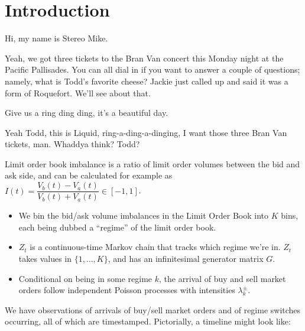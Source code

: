 \chapter{Introduction}
Hi, my name is Stereo Mike.

Yeah, we got three tickets to the Bran Van concert this Monday night at the Pacific Pallisades. You can all dial in if you want to answer a couple of questions; namely, what is Todd's favorite cheese? Jackie just called up and said it was a form of Roquefort. We'll see about that.

Give us a ring ding ding, it's a beautiful day.

Yeah Todd, this is Liquid, ring-a-ding-a-dinging, I want those three Bran Van tickets, man. Whaddya think? Todd?


Limit order book imbalance is a ratio of limit order volumes between the bid and ask side, and can be calculated for example as $I(t) = \dfrac{V_b(t) - V_a(t)}{V_b(t) + V_a(t)} \in [-1,1]$.
\begin{itemize}
\item We bin the bid/ask volume imbalances in the Limit Order Book into $K$ bins, each being dubbed a ``regime'' of the limit order book. 
\item $Z_t$ is a continuous-time Markov chain that tracks which regime we're in. $Z_t$ takes values in $\{1, \dots , K\}$, and has an infinitesimal generator matrix $G$.
\item Conditional on being in some regime $k$, the arrival of buy and sell market orders follow independent Poisson processes with intensities $\lambda^{\pm}_k$.
\end{itemize}

We have observations of arrivals of buy/sell market orders and of regime switches occurring, all of which are timestamped. Pictorially, a timeline might look like:

